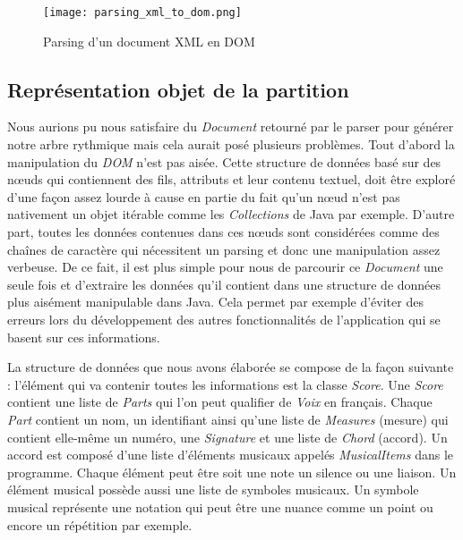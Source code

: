\begin{figure}[!h]
\centering
\texttt{[image: parsing\_xml\_to\_dom.png]}\\[1cm]
\caption{Parsing d'un document XML en DOM}
\label{Parsing d'un document XML en DOM}
\end{figure}


\subsection{Représentation objet de la partition}

\par
Nous aurions pu nous satisfaire du \emph{Document} retourné par le parser pour
générer notre arbre rythmique mais cela aurait posé plusieurs problèmes. Tout d'abord
la manipulation du \emph{DOM} n'est pas aisée. Cette structure de données basé sur
des nœuds qui contiennent des fils, attributs et leur contenu textuel, doit
être exploré d'une façon assez lourde à cause en partie du fait qu'un nœud n'est
pas nativement un objet itérable comme les \emph{Collections} de Java par exemple.
D'autre part, toutes les données contenues dans ces nœuds sont considérées comme des chaînes
de caractère qui nécessitent un parsing et donc une manipulation assez verbeuse.
De ce fait, il est plus simple pour nous de parcourir ce \emph{Document} une seule fois et d'extraire les données qu'il
contient dans une structure de données plus aisément manipulable dans Java. Cela
permet par exemple d'éviter des erreurs lors du développement des autres fonctionnalités de
l'application qui se basent sur ces informations.


\par
La structure de données que nous avons élaborée se compose de la façon suivante :
l'élément qui va contenir toutes les informations est la classe \emph{Score}. Une
\emph{Score} contient une liste de \emph{Parts} qui l'on peut qualifier de
\emph{Voix} en français. Chaque \emph{Part} contient un nom, un identifiant ainsi qu'une liste
de \emph{Measures} (mesure) qui contient elle-même un numéro, une \emph{Signature} et une
liste de \emph{Chord} (accord). Un accord est composé d'une liste d'éléments musicaux
appelés \emph{MusicalItems} dans le programme. Chaque élément peut être soit une note
un silence ou une liaison. Un élément musical possède aussi une liste de symboles
musicaux. Un symbole musical représente une notation qui peut être une nuance comme
un point ou encore un répétition par exemple.

